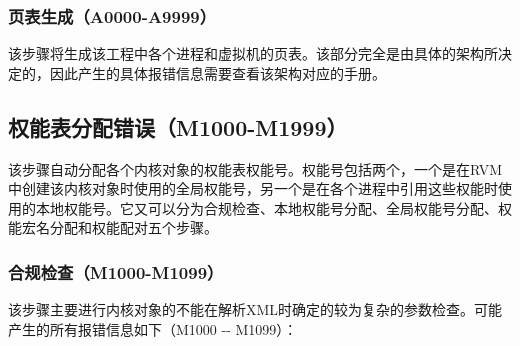 \subsubsection{页表生成（A0000-A9999）}\label{subsubsec:5-6-4-3}

该步骤将生成该工程中各个进程和虚拟机的页表。该部分完全是由具体的架构所决定的，因此产生的具体报错信息需要查看该架构对应的手册。

\newpage
\subsection{权能表分配错误（M1000-M1999）}\label{subsec:5-6-5}

该步骤自动分配各个内核对象的权能表权能号。权能号包括两个，一个是在RVM中创建该内核对象时使用的全局权能号，另一个是在各个进程中引用这些权能时使用的本地权能号。它又可以分为合规检查、本地权能号分配、全局权能号分配、权能宏名分配和权能配对五个步骤。

\subsubsection{合规检查（M1000-M1099）}\label{subsubsec:5-6-5-1}

该步骤主要进行内核对象的不能在解析XML时确定的较为复杂的参数检查。可能产生的所有报错信息如下（M1000
-\/- M1099）：

